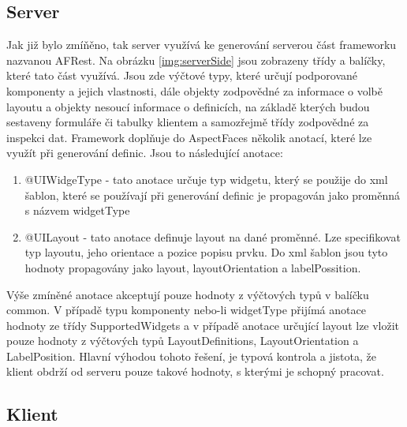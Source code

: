 \subsection{Server}
Jak již bylo zmíňěno, tak server využívá ke generování serverou část frameworku nazvanou AFRest. Na obrázku \ref{img:serverSide} jsou zobrazeny třídy a balíčky, které tato část využívá. Jsou zde výčtové typy, které určují podporované komponenty a jejich vlastnosti, dále objekty zodpovědné za informace o volbě layoutu a objekty nesoucí informace o definicích, na základě kterých budou sestaveny formuláře či tabulky klientem a samozřejmě třídy zodpovědné za inspekci dat. Framework doplňuje do AspectFaces několik anotací, které lze využít při generování definic. Jsou to následující anotace:
\begin{enumerate}
\item @UIWidgeType - tato anotace určuje typ widgetu, který se použije do xml šablon, které se používají při generování definic je propagován jako proměnná s názvem widgetType
\item @UILayout - tato anotace definuje layout na dané proměnné. Lze specifikovat typ layoutu, jeho orientace a pozice popisu prvku. Do xml šablon jsou tyto hodnoty propagovány jako layout, layoutOrientation a labelPossition. 
\end{enumerate}
Výše zmíněné anotace akceptují pouze hodnoty z výčtových typů v balíčku common. V případě typu komponenty nebo-li widgetType přijímá anotace hodnoty ze třídy SupportedWidgets a v případě anotace určující layout lze vložit pouze hodnoty z výčtových typů LayoutDefinitions, LayoutOrientation a LabelPosition. Hlavní výhodou tohoto řešení, je typová kontrola a jistota, že klient obdrží od serveru pouze takové hodnoty, s kterými je schopný pracovat.

\subsection{Klient}
